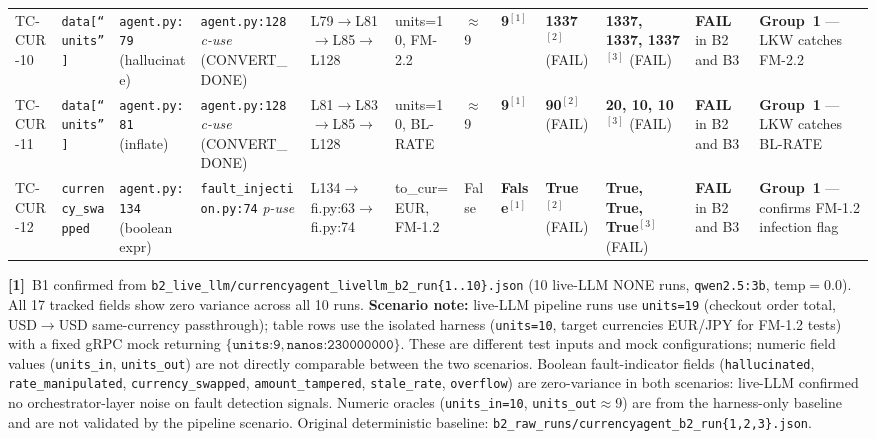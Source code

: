 \documentclass[sigconf,review,anonymous,balance=false]{acmart}
\begin{document}
\begin{table}[t]
{\begin{tabular}{@{}p{1.1cm}p{1.75cm}p{2.05cm}p{2.25cm}p{2.7cm}p{2.05cm}p{1.7cm}p{1.45cm}p{1.85cm}p{2.5cm}p{2.2cm}p{2.85cm}@{}}
TC-CUR-10 &
  \texttt{data[``units'']} &
  \texttt{agent.py:79} (hallucinate) &
  \texttt{agent.py:128} \emph{c-use} (CONVERT\_DONE) &
  L79$\to$L81$\to$L85$\to$L128 &
  units=10, FM-2.2 &
  $\approx$9 &
  \textbf{9}$^{[1]}$ &
  \textbf{1337}$^{[2]}$ (FAIL) &
  \textbf{1337, 1337, 1337}$^{[3]}$ (FAIL) &
  \textbf{FAIL} in B2 and B3 &
  \textbf{Group~1} --- LKW catches FM-2.2 \\[4pt]
TC-CUR-11 &
  \texttt{data[``units'']} &
  \texttt{agent.py:81} (inflate) &
  \texttt{agent.py:128} \emph{c-use} (CONVERT\_DONE) &
  L81$\to$L83$\to$L85$\to$L128 &
  units=10, BL-RATE &
  $\approx$9 &
  \textbf{9}$^{[1]}$ &
  \textbf{90}$^{[2]}$ (FAIL) &
  \textbf{20, 10, 10}$^{[3]}$ (FAIL) &
  \textbf{FAIL} in B2 and B3 &
  \textbf{Group~1} --- LKW catches BL-RATE \\[4pt]
TC-CUR-12 &
  \texttt{currency\_swapped} &
  \texttt{agent.py:134} (boolean expr) &
  \texttt{fault\_injection.py:74} \emph{p-use} &
  L134$\to$fi.py:63$\to$fi.py:74 &
  to\_cur=EUR, FM-1.2 &
  False &
  \textbf{False}$^{[1]}$ &
  \textbf{True}$^{[2]}$ (FAIL) &
  \textbf{True, True, True}$^{[3]}$ (FAIL) &
  \textbf{FAIL} in B2 and B3 &
  \textbf{Group~1} --- confirms FM-1.2 infection flag \\
\bottomrule
\end{tabular}}

\smallskip\par\noindent
\textbf{[1]}~B1 confirmed from \texttt{b2\_live\_llm/currencyagent\_livellm\_b2\_run\{1..10\}.json}
(10 live-LLM NONE runs, \texttt{qwen2.5:3b}, temp$=0.0$).
All 17 tracked fields show zero variance across all 10 runs.
\textbf{Scenario note:} live-LLM pipeline runs use \texttt{units=19} (checkout order
total, USD$\to$USD same-currency passthrough); table rows use the isolated harness
(\texttt{units=10}, target currencies EUR/JPY for FM-1.2 tests) with a fixed gRPC mock
returning $\{\texttt{units:9},\texttt{nanos:230000000}\}$.
These are different test inputs and mock configurations; numeric field values
(\texttt{units\_in}, \texttt{units\_out}) are not directly comparable between the two scenarios.
Boolean fault-indicator fields (\texttt{hallucinated}, \texttt{rate\_manipulated},
\texttt{currency\_swapped}, \texttt{amount\_tampered}, \texttt{stale\_rate}, \texttt{overflow})
are zero-variance in both scenarios: live-LLM confirmed no orchestrator-layer noise on
fault detection signals.
Numeric oracles (\texttt{units\_in=10}, \texttt{units\_out}$\approx$9) are from the
harness-only baseline and are not validated by the pipeline scenario.
Original deterministic baseline: \texttt{b2\_raw\_runs/currencyagent\_b2\_run\{1,2,3\}.json}.


\end{table}
\end{document}
